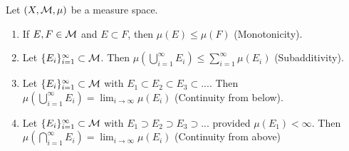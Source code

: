     \begin{proposition}
        Let $(X,\mathcal{M},\mu)$ be a measure space.
        \begin{enumerate}[label = (\arabic*),itemsep=1pt,topsep=3pt]
            \item If $E,F \in \mathcal{M}$ and $E \subset F$, then $\mu(E) \leq \mu(F)$ (Monotonicity).
            \item Let $\{E_i\}_{i = 1}^\infty \subset \mathcal{M}$. Then $\mu \left( \bigcup_{i = 1}^\infty E_i \right) \leq \sum_{i = 1}^\infty \mu(E_i)$ (Subadditivity).
            \item Let $\{E_i\}_{i = 1}^\infty \subset \mathcal{M}$ with $E_1 \subset E_2 \subset E_3 \subset...$. Then $\mu \left( \bigcup_{i = 1}^\infty E_i \right) = \lim_{i \rightarrow \infty}\mu(E_i)$ (Continuity from below).
            \item Let $\{E_i\}_{i = 1}^\infty \subset \mathcal{M}$ with $E_1 \supset E_2 \supset E_3 \supset ...$ provided $\mu(E_1) < \infty$. Then $\mu \left( \bigcap_{i = 1}^\infty E_i \right) = \lim_{i \rightarrow \infty}\mu(E_i)$ (Continuity from above)
        \end{enumerate}
    \end{proposition}

